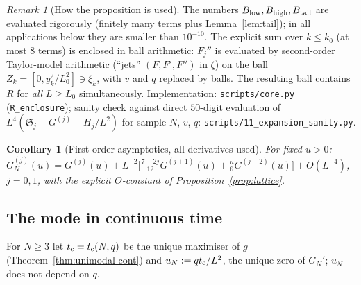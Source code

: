 \documentclass[11pt,a4paper]{article}
\newtheorem{corollary}[theorem]{Corollary}
\theoremstyle{definition}
\theoremstyle{remark}
\newtheorem{remark}[theorem]{Remark}
\begin{document}
\begin{remark}[How the proposition is used]\label{rem:usage}
The numbers $B_{\rm low},B_{\rm high},B_{\rm tail}$ are evaluated rigorously (finitely many terms plus
Lemma~\ref{lem:tail}); in all applications below they are smaller than $10^{-10}$. The explicit sum over $k\le k_0$
(at most $8$ terms) is enclosed in ball arithmetic: $F_j''$ is evaluated by second-order Taylor-model
arithmetic (``jets'' $(F,F',F'')$ in $\zeta$) on the ball $Z_k=[0,y_k^2/L_0^2]\ni\xi_k$, with $v$ and $q$ replaced
by balls. The resulting ball contains $R$ for \emph{all} $L\ge L_0$ simultaneously. Implementation:
\texttt{scripts/core.py} (\texttt{R\_enclosure}); sanity check against direct $50$-digit evaluation of
$L^4(\mathfrak S_j-G^{(j)}-H_j/L^2)$ for sample $N$, $v$, $q$: \texttt{scripts/11\_expansion\_sanity.py}.
\end{remark}

\begin{corollary}[First-order asymptotics, all derivatives used]\label{cor:firstorder}
For fixed $u>0$: $G_N^{(j)}(u)=G^{(j)}(u)+L^{-2}\bigl[\frac{7+2j}{12}G^{(j+1)}(u)+\frac u6G^{(j+2)}(u)\bigr]+O(L^{-4})$,
$j=0,1$, with the explicit $O$-constant of Proposition~\ref{prop:lattice}.
\end{corollary}

\subsection{The mode in continuous time}

For $N\ge3$ let $t_{\rm c}=t_{\rm c}(N,q)$ be the unique maximiser of $g$ (Theorem~\ref{thm:unimodal-cont}) and
$u_N:=qt_{\rm c}/L^2$, the unique zero of $G_N'$; $u_N$ does not depend on $q$.
\end{document}

